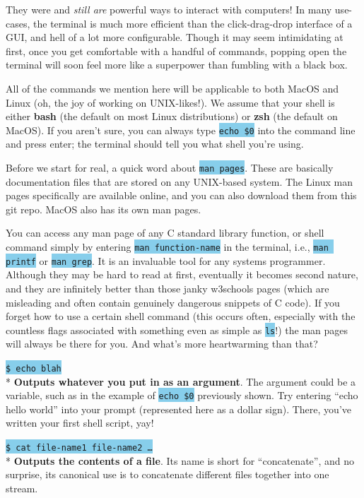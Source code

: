 \documentclass[fontsize=12pt,twoside=on,openright,parskip=half]{scrbook}
\newcommand{\code}[1]{\colorbox{skyblue}{\texttt{#1}}}
\begin{document}
They were and \emph{still are} powerful ways to interact with computers! In
many use-cases, the terminal is much more efficient than the click-drag-drop
interface of a GUI, and hell of a lot more configurable. Though it may seem
intimidating at first, once you get comfortable with a handful of commands,
popping open the terminal will soon feel more like a superpower than fumbling
with a black box.

All of the commands we mention here will be applicable to both MacOS and Linux
(oh, the joy of working on UNIX-likes!). We assume that your shell is either
\textbf{bash} (the default on most Linux distributions) or \textbf{zsh} (the
default on MacOS). If you aren’t sure, you can always type \code{echo \$0} into
the command line and press enter; the terminal should tell you what shell
you’re using. 

Before we start for real, a quick word about \code{man pages}. These are
basically documentation files that are stored on any UNIX-based system. The
Linux man pages specifically are available online, and you can also download
them from this git repo. MacOS also has its own man pages.

You can access any man page of any C standard library function, or shell
command simply by entering \code{man function-name} in the terminal, i.e.,
\code{man printf} or \code{man grep}. It is an invaluable tool for any systems
programmer. Although they may be hard to read at first, eventually it becomes
second nature, and they are infinitely better than those janky w3schools pages
(which are misleading and often contain genuinely dangerous snippets of C
code). If you forget how to use a certain shell command (this occurs often,
especially with the countless flags associated with something even as simple as
\code{ls}!) the man pages will always be there for you. And what’s more
heartwarming than that?

\code{\$ echo blah} \\*
\textbf{Outputs whatever you put in as an argument}. The argument could be a
variable, such as in the example of \code{echo \$0} previously shown. Try
entering “echo hello world” into your prompt (represented here as a dollar
sign). There, you’ve written your first shell script, yay!

\code{\$ cat file-name1 file-name2 \ldots} \\*
\textbf{Outputs the contents of a file}. Its name is short for “concatenate”,
and no surprise, its canonical use is to concatenate different files together
into one stream.
\end{document}
